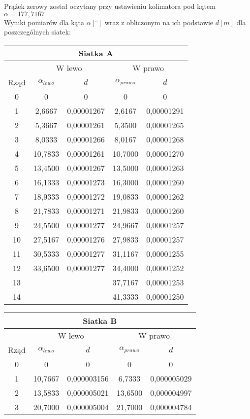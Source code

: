 \documentclass[10pt,a4paper]{article}
\begin{document}
Prążek zerowy został oczytany przy ustawieniu kolimatora pod kątem $\alpha = 177,7167$\\

Wyniki pomiarów dla kąta $\alpha[^\circ]$ wraz z obliczonym na ich podstawie $d[m]$ dla poszczególnych siatek:

\begin{center}
\begin{tabular}{|c|c|c|c|c|}
\hline
\multicolumn{5}{|c|}{Siatka A}\\
\hline
& \multicolumn{2}{c}{W lewo} & \multicolumn{2}{|c|}{W prawo}\\
\hline
Rząd & $\alpha_{lewo}$ & $d$ &$\alpha_{prawo}$&$d$\\
\hline
0&0&0&0&0\\ 
\hline
1&2,6667&0,00001267&2,6167&0,00001291\\ 
\hline 
2&5,3667&0,00001261&5,3500&0,00001265\\ 
\hline 
3&8,0333&0,00001266&8,0167&0,00001268\\ 
\hline 
4&10,7833&0,00001261&10,7000&0,00001270\\ 
\hline 
5&13,4500&0,00001267&13,5000&0,00001263\\ 
\hline 
6&16,1333&0,00001273&16,3000&0,00001260\\ 
\hline 
7&18,9333&0,00001272&19,0833&0,00001262\\ 
\hline 
8&21,7833&0,00001271&21,9833&0,00001260\\ 
\hline 
9&24,5500&0,00001277&24,9667&0,00001257\\ 
\hline 
10&27,5167&0,00001276&27,9833&0,00001257\\ 
\hline 
11&30,5333&0,00001277&31,1167&0,00001255\\ 
\hline 
12&33,6500&0,00001277&34,4000&0,00001252\\ 
\hline 
13&&&37,7167&0,00001253\\ 
\hline 
14&&&41,3333&0,00001250\\ 
\hline 
\end{tabular}
\end{center}

\begin{center}
\begin{tabular}{|c|c|c|c|c|}
\hline
\multicolumn{5}{|c|}{Siatka B}\\
\hline
& \multicolumn{2}{c}{W lewo} & \multicolumn{2}{|c|}{W prawo}\\
\hline
Rząd & $\alpha_{lewo}$ & $d$ &$\alpha_{prawo}$&$d$\\
\hline
0&0&0&0&0\\ 
\hline
1&10,7667&0,000003156&6,7333&0,000005029\\ 
\hline 
2&13,5833&0,000005021&13,6500&0,000004997\\ 
\hline 
3&20,7000&0,000005004&21,7000&0,000004784\\ 
\hline 
 
\end{tabular}
\end{center}
\end{document}
